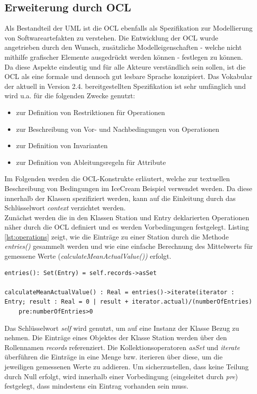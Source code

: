 \documentclass[a4paper,twoside]{article}
\begin{document}
\subsection{Erweiterung durch OCL} 
\label{ssec:ocl}
Als Bestandteil der UML ist die OCL ebenfalls als Spezifikation zur Modellierung von Softwareartefakten zu verstehen. Die Entwicklung der OCL wurde angetrieben durch den Wunsch, zusätzliche Modelleigenschaften - welche nicht mithilfe grafischer Elemente ausgedrückt werden können - festlegen zu können. \cite[S.5f]{OCLFormal} Da diese Aspekte eindeutig und für alle Akteure verständlich sein sollen, ist die OCL als eine formale und dennoch gut lesbare Sprache konzipiert. Das Vokabular der aktuell in Version 2.4. bereitgestellten Spezifikation ist sehr umfänglich und wird u.a. für die folgenden Zwecke genutzt: \begin{itemize}
\item zur Definition von Restriktionen für Operationen
\item zur Beschreibung von Vor- und Nachbedingungen von Operationen 
\item zur Definition von Invarianten
\item zur Definition von Ableitungsregeln für Attribute
\end{itemize} 
Im Folgenden werden die OCL-Konstrukte erläutert, welche zur textuellen Beschreibung von Bedingungen im IceCream Beispiel verwendet werden. Da diese innerhalb der Klassen spezifiziert werden, kann auf die Einleitung durch das Schlüsselwort \textit{context} verzichtet werden.
\\

Zunächst werden die in den Klassen Station und Entry deklarierten Operationen näher durch die OCL definiert und es werden Vorbedingungen festgelegt. Listing \ref{lst:operations} zeigt, wie die Einträge zu einer Station durch die Methode \textit{entries()} gesammelt werden und wie eine einfache Berechnung des Mittelwerts für gemessene Werte (\textit{calculateMeanActualValue())} erfolgt.  
\begin{lstlisting}[caption={OCL-erweiterte Operationen der Klasse Station},label=lst:operations]
entries(): Set(Entry) = self.records->asSet

calculateMeanActualValue() : Real = entries()->iterate(iterator : Entry; result : Real = 0 | result + iterator.actual)/(numberOfEntries) 
	pre:numberOfEntries>0
\end{lstlisting}
Das Schlüsselwort \textit{self} wird genutzt, um auf eine Instanz der Klasse Bezug zu nehmen. Die Einträge eines Objektes der Klasse Station werden über den Rollennamen \textit{records} referenziert. Die Kollektionsoperatoren \textit{asSet} und \textit{iterate} überführen die Einträge in eine Menge bzw. iterieren über diese, um die jeweiligen gemessenen Werte zu addieren. Um sicherzustellen, dass keine Teilung durch Null erfolgt, wird innerhalb einer Vorbedingung (eingeleitet durch \textit{pre}) festgelegt, dass mindestens ein Eintrag vorhanden sein muss. 
\end{document}
